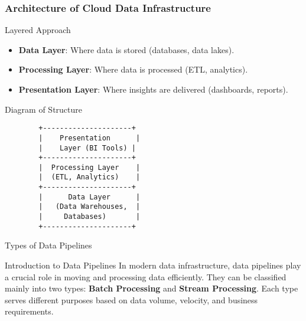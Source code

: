 \documentclass[aspectratio=169]{beamer}
\begin{document}
\begin{frame}[fragile]
    \frametitle{Architecture of Cloud Data Infrastructure}
    \begin{block}{Layered Approach}
        \begin{itemize}
            \item \textbf{Data Layer}: Where data is stored (databases, data lakes).
            \item \textbf{Processing Layer}: Where data is processed (ETL, analytics).
            \item \textbf{Presentation Layer}: Where insights are delivered (dashboards, reports).
        \end{itemize}
    \end{block}
    
    \begin{block}{Diagram of Structure}
        \begin{verbatim}
        +---------------------+
        |    Presentation      |
        |    Layer (BI Tools) |
        +---------------------+
        |  Processing Layer    |
        |  (ETL, Analytics)    |
        +---------------------+
        |      Data Layer      |
        |   (Data Warehouses,  |
        |     Databases)       |
        +---------------------+
        \end{verbatim}
    \end{block}
\end{frame}

\begin{frame}[fragile]{Types of Data Pipelines}
    \begin{block}{Introduction to Data Pipelines}
        In modern data infrastructure, data pipelines play a crucial role in moving and processing data efficiently. They can be classified mainly into two types: \textbf{Batch Processing} and \textbf{Stream Processing}. Each type serves different purposes based on data volume, velocity, and business requirements.
    \end{block}
\end{frame}
\end{document}
